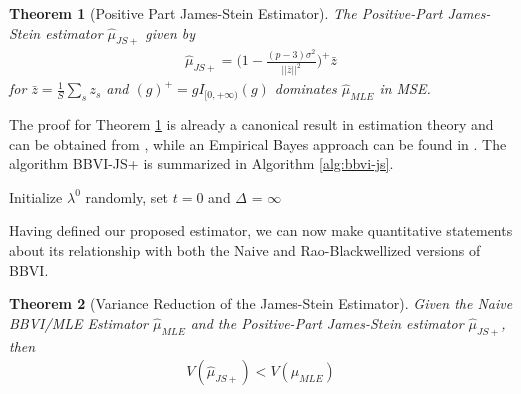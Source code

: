 \documentclass{article}
\newtheorem{theorem}{Theorem}
\begin{document}
\begin{theorem}[Positive Part James-Stein Estimator]
    \label{thm:jsteinplus}
    The Positive-Part James-Stein estimator $\hat\mu_{JS+}$ given by
    \begin{align*}
        \hat\mu_{JS+} = \bigg(1 - \frac{(p-3) \sigma^2}{|| \bar{z} ||^2} \bigg)^+ \bar{z}
    \end{align*}
    for $\bar{z} = \frac{1}{S} \sum_{s} z_s$ and $(g)^+ = gI_{[0, +\infty)}(g)$ dominates $\hat\mu_{MLE}$ in MSE.
\end{theorem}

The proof for Theorem \ref{thm:jsteinplus} is already a canonical result in estimation theory and can be obtained from \cite{Lehmann-1998}, while an Empirical Bayes approach can be found in \cite{Efron-1973}. The algorithm BBVI-JS+ is summarized in Algorithm \ref{alg:bbvi-js}.

\begin{algorithm}[ht]
    \label{alg:bbvi-js}
    \caption{Positive-Part James-Stein BBVI (BBVI-JS+)}

    \DontPrintSemicolon
    \SetAlgoLined
    Initialize $\lambda^0$ randomly, set $t=0$ and $\Delta$ = $\infty$ \;
    \BlankLine
\end{algorithm}

Having defined our proposed estimator, we can now make quantitative statements about its relationship with both the Naive and Rao-Blackwellized versions of BBVI.

\begin{theorem}[Variance Reduction of the James-Stein Estimator]
    \label{thm:varcontrol1}
    Given the Naive BBVI/MLE Estimator $\hat\mu_{MLE}$ and the Positive-Part James-Stein estimator $\hat\mu_{JS+}$, then
    \begin{align*}
        V(\hat\mu_{JS+}) <  V(\hat\mu_{MLE})
    \end{align*}
\end{theorem}
\end{document}
